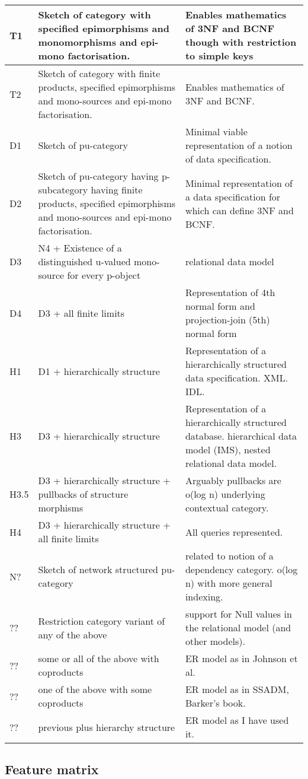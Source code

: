 \documentclass[10pt,a4paper]{article}
\theoremstyle{remark}
\begin{document}
\begin{tabular}{|l|p{6cm}|p{6cm}|}
\hline
T1 & Sketch of category with specified epimorphisms and monomorphisms and epi-mono factorisation.
   & Enables mathematics of 3NF and BCNF though with restriction to simple keys \\
\hline
T2 & Sketch of category with finite products, specified epimorphisms and mono-sources and epi-mono factorisation.
   & Enables mathematics of 3NF and BCNF. \\
\hline
D1 & Sketch of pu-category    
   & Minimal viable representation of a notion of data specification. \\
\hline
D2 & Sketch of pu-category having p-subcategory having finite products, 
     specified epimorphisms and mono-sources   and epi-mono factorisation.
   & Minimal representation of a data specification for which can define 3NF and BCNF. \\
\hline
D3 & N4 {\Large +} Existence of a distinguished u-valued mono-source for every p-object & relational data model \\
\hline 
D4 & D3 {\Large +} all finite limits 
   & Representation of 4th normal form and projection-join (5th) normal form  \\
\hline
H1 & D1 {\Large +} hierarchically structure
   &  Representation of a hierarchically structured data specification. XML. IDL. \\
\hline
H3 & D3  {\Large +} hierarchically structure
   &  Representation of a hierarchically structured database. hierarchical data model (IMS), nested relational data model. \\
\hline
H3.5 & D3  {\Large +} hierarchically structure + pullbacks of structure morphisms
   &  Arguably pullbacks are o(log n) underlying contextual category.\\
\hline
H4 & D3  {\Large +} hierarchically structure + all finite limits 
   &  All queries represented.\\
\hline
N? & Sketch of network structured pu-category
   & related to notion of a dependency category. o(log n) with more general indexing. \\
\hline
?? & Restriction category variant of any of the above 
   & support for Null values in the relational model (and other models). \\
\hline 
?? & some or all of the above with coproducts 
   & ER model as in Johnson et al. \\
\hline
?? & one of the above with some coproducts
   & ER model as in SSADM, Barker's book. \\
\hline
?? & previous plus hierarchy structure 
   & ER model as I have used it. \\
\hline
\end{tabular}



\subsection{Feature matrix}


\end{document}
